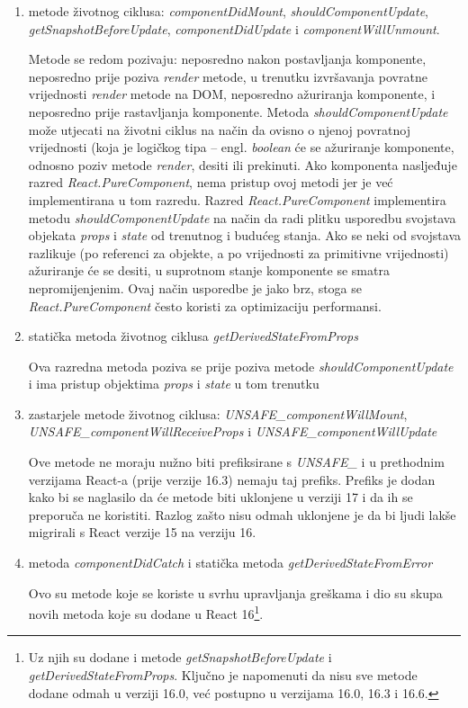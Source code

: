 \documentclass[times, utf8, diplomski, numeric]{fer}
\newcommand{\razmaks}{\vspace{10pt}}
\begin{document}
\begin{enumerate}[label=(\alph*)]
    \item metode životnog ciklusa: \emph{componentDidMount}, \emph{shouldComponentUpdate},
    \break \emph{getSnapshotBeforeUpdate}, \emph{componentDidUpdate} i \emph{componentWillUnmount}.
    
    Metode se redom pozivaju: neposredno nakon postavljanja komponente, neposredno prije poziva \emph{render} metode, u trenutku izvršavanja  povratne vrijednosti \emph{render} metode na DOM, neposredno ažuriranja komponente, i neposredno prije rastavljanja komponente.
    Metoda \emph{shouldComponentUpdate} može utjecati na životni ciklus na način da ovisno o njenoj povratnoj vrijednosti (koja je logičkog tipa – engl. \emph{boolean} će se ažuriranje komponente, odnosno poziv metode \emph{render}, desiti ili prekinuti.
    Ako komponenta nasljeđuje razred \emph{React.PureComponent}, nema pristup ovoj metodi jer je već implementirana u tom razredu.
    Razred \emph{React.PureComponent} implementira metodu \emph{shouldComponentUpdate} na način da radi plitku usporedbu  svojstava objekata \emph{props} i \emph{state} od trenutnog i budućeg stanja. Ako se neki od svojstava razlikuje (po referenci za objekte, a po vrijednosti za primitivne vrijednosti) ažuriranje će se desiti, u suprotnom stanje komponente se smatra nepromijenjenim. Ovaj način usporedbe je jako brz, stoga se \emph{React.PureComponent} često koristi za optimizaciju performansi\citep{react_docs}.

    \item statička metoda životnog ciklusa \emph{getDerivedStateFromProps}
    
    Ova razredna metoda poziva se prije poziva metode \emph{shouldComponentUpdate} i ima pristup objektima \emph{props} i \emph{state} u tom trenutku

    \item zastarjele metode životnog ciklusa: \emph{UNSAFE\_componentWillMount},
    \break \emph{UNSAFE\_componentWillReceiveProps} i \emph{UNSAFE\_componentWillUpdate}
    
    Ove metode ne moraju nužno biti prefiksirane s \emph{UNSAFE\_} i u prethodnim verzijama React-a (prije verzije 16.3) nemaju taj prefiks.
    Prefiks je dodan kako bi se naglasilo da će metode biti uklonjene u verziji 17 i da ih se preporuča ne koristiti.
    Razlog zašto nisu odmah uklonjene je da bi ljudi lakše migrirali s React verzije 15 na verziju 16\citep{react_16_3}.

    \item metoda \emph{componentDidCatch} i statička metoda \emph{getDerivedStateFromError}
    
    Ovo su metode koje se koriste u svrhu upravljanja greškama  i dio su skupa novih metoda koje su dodane u React 16\footnote{
        Uz njih su dodane i metode \emph{getSnapshotBeforeUpdate} i \emph{getDerivedStateFromProps}. Ključno je napomenuti da nisu sve metode dodane odmah u verziji 16.0, već postupno u verzijama 16.0, 16.3 i 16.6\citep{gh_react_changelog}.
    }\citep{react_error}.
\end{enumerate}
\razmaks
\end{document}
